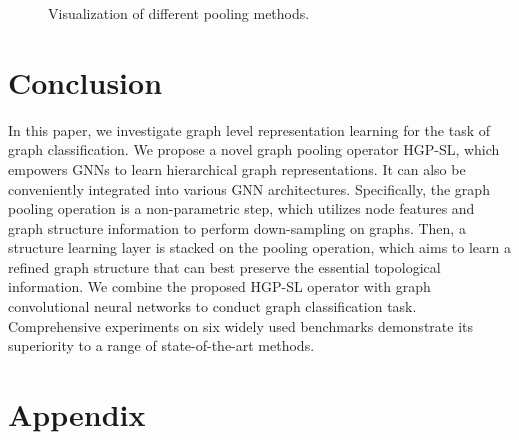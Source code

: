 \documentclass[letterpaper]{article} \usepackage{aaai20}  \usepackage{times}  \usepackage{helvet} \usepackage{courier}  \usepackage[hyphens]{url}  \usepackage{graphicx} \urlstyle{rm} \def\UrlFont{\rm}  \usepackage{graphicx}  \frenchspacing  \setlength{\pdfpagewidth}{8.5in}  \setlength{\pdfpageheight}{11in}
\begin{document}
\begin{figure}[!htb]\small
\centering
{}
\caption{Visualization of different pooling methods.}
\label{fig:visualization}
\end{figure} 

\section{Conclusion}
In this paper, we investigate graph level representation learning for the task of graph classification. We propose a novel graph pooling operator HGP-SL, which empowers GNNs to learn hierarchical graph representations. It can also be conveniently integrated into various GNN architectures. Specifically, the graph pooling operation is a non-parametric step, which utilizes node features and graph structure information to perform down-sampling on graphs. Then, a structure learning layer is stacked on the pooling operation, which aims to learn a refined graph structure that can best preserve the essential topological information. We combine the proposed HGP-SL operator with graph convolutional neural networks to conduct graph classification task. Comprehensive experiments on six widely used benchmarks demonstrate its superiority to a range of state-of-the-art methods.




\newpage
\section{Appendix}
\end{document}
